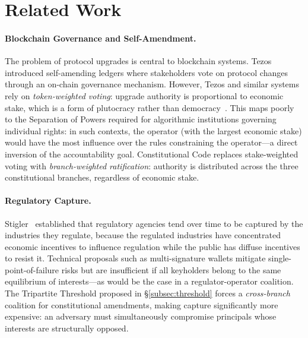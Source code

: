 \section{Related Work}
\label{sec:related}

\paragraph{Blockchain Governance and Self-Amendment.}
The problem of protocol upgrades is central to blockchain
systems. Tezos~\cite{goodman2014} introduced self-amending ledgers
where stakeholders vote on protocol changes through an on-chain
governance mechanism. However, Tezos and similar systems rely on
\emph{token-weighted voting}: upgrade authority is proportional to
economic stake, which is a form of plutocracy rather than
democracy~\cite{buterin2021}. This maps poorly to the Separation of
Powers required for algorithmic institutions governing individual
rights: in such contexts, the operator (with the largest economic
stake) would have the most influence over the rules constraining
the operator---a direct inversion of the accountability goal.
Constitutional Code replaces stake-weighted voting with
\emph{branch-weighted ratification}: authority is distributed across
the three constitutional branches, regardless of economic stake.

\paragraph{Regulatory Capture.}
Stigler~\cite{stigler1971} established that regulatory agencies tend
over time to be captured by the industries they regulate, because
the regulated industries have concentrated economic incentives to
influence regulation while the public has diffuse incentives to
resist it. Technical proposals such as multi-signature wallets
mitigate single-point-of-failure risks but are insufficient if all
keyholders belong to the same equilibrium of interests---as would
be the case in a regulator-operator coalition. The Tripartite
Threshold proposed in \S\ref{subsec:threshold} forces a
\emph{cross-branch} coalition for constitutional amendments,
making capture significantly more expensive: an adversary must
simultaneously compromise principals whose interests are
structurally opposed.

